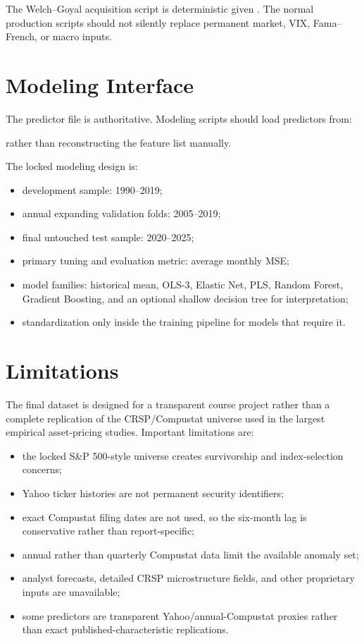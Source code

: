 \documentclass[11pt,a4paper]{article}
\begin{document}
The Welch--Goyal acquisition script is deterministic given . The normal production scripts should not silently replace permanent market, VIX, Fama--French, or macro inputs.

\section{Modeling Interface}

The predictor file is authoritative. Modeling scripts should load predictors from:
\begin{center}
\end{center}
rather than reconstructing the feature list manually.

The locked modeling design is:
\begin{itemize}
  \item development sample: 1990--2019;
  \item annual expanding validation folds: 2005--2019;
  \item final untouched test sample: 2020--2025;
  \item primary tuning and evaluation metric: average monthly MSE;
  \item model families: historical mean, OLS-3, Elastic Net, PLS, Random Forest, Gradient Boosting, and an optional shallow decision tree for interpretation;
  \item standardization only inside the training pipeline for models that require it.
\end{itemize}

\section{Limitations}

The final dataset is designed for a transparent course project rather than a complete replication of the CRSP/Compustat universe used in the largest empirical asset-pricing studies. Important limitations are:
\begin{itemize}
  \item the locked S\&P 500-style universe creates survivorship and index-selection concerns;
  \item Yahoo ticker histories are not permanent security identifiers;
  \item exact Compustat filing dates are not used, so the six-month lag is conservative rather than report-specific;
  \item annual rather than quarterly Compustat data limit the available anomaly set;
  \item analyst forecasts, detailed CRSP microstructure fields, and other proprietary inputs are unavailable;
  \item some predictors are transparent Yahoo/annual-Compustat proxies rather than exact published-characteristic replications.
\end{itemize}
\end{document}

